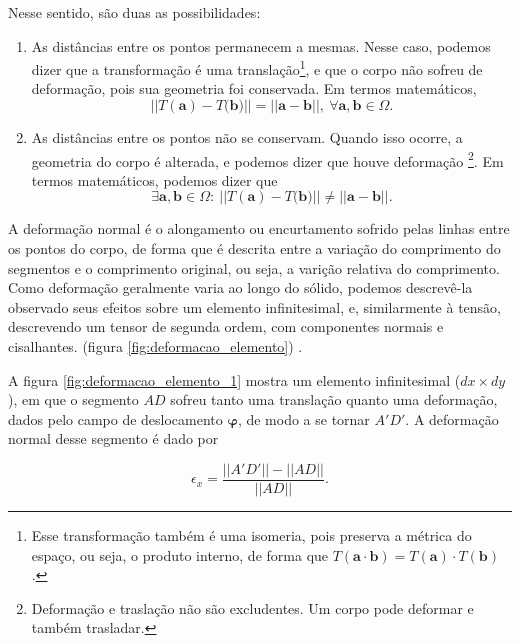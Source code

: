 Nesse sentido, são duas as possibilidades:
\begin{enumerate}
    \item As distâncias entre os pontos permanecem a mesmas. Nesse caso, podemos dizer que a transformação é uma translação\footnote{Esse transformação também é uma isomeria, pois preserva a métrica do espaço, ou seja, o produto interno, de forma que $ T(\bm{a} \cdot \bm{b}) = T(\bm{a}) \cdot T(\bm{b}) $.}, e que o corpo não sofreu de deformação, pois sua geometria foi conservada. Em termos matemáticos,
        \begin{equation}
            ||{T(\bm{a}) - T(\bm{b}})|| = ||{\bm{a} - \bm{b}}||, \ \forall \bm{a}, \bm{b} \in \Omega. 
        \end{equation}        
    \item As distâncias entre os pontos não se conservam. Quando isso ocorre, a geometria do corpo é alterada, e podemos dizer que houve deformação \footnote{Deformação e traslação não são excludentes. Um corpo pode deformar e também trasladar.}. Em termos matemáticos, podemos dizer que
        \begin{equation}
             \exists \bm{a}, \bm{b} \in \Omega : \ ||{T(\bm{a}) - T(\bm{b}})|| \neq ||{\bm{a} - \bm{b}}||.
        \end{equation}
\end{enumerate}


A deformação normal é o alongamento ou encurtamento sofrido pelas linhas entre os pontos do corpo, de forma que é descrita entre a variação do comprimento do segmentos e o comprimento original, ou seja, a varição relativa do comprimento.
Como deformação geralmente varia ao longo do sólido, podemos descrevê-la observado seus efeitos sobre um elemento infinitesimal, e, similarmente à tensão, descrevendo um tensor de segunda ordem, com componentes normais e cisalhantes. (figura \ref{fig:deformacao_elemento}) \cite[pág. 143]{popov}.

A figura \ref{fig:deformacao_elemento_1} mostra um elemento infinitesimal ($dx \times dy$), em que o segmento $AD$ sofreu tanto uma translação quanto uma deformação, dados pelo campo de deslocamento $\bm{\varphi}$, de modo a se tornar $A'D'$. A deformação normal desse segmento é dado por

\begin{equation}
    \epsilon_x = \frac{||A'D'|| - ||AD||}{||AD||}.
    \label{eq:deforma}
\end{equation}



